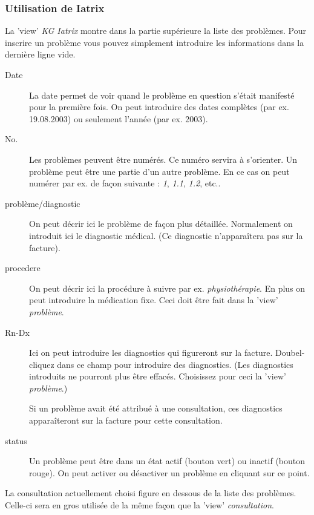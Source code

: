 \subsubsection{Utilisation de Iatrix}

La 'view' \textit{KG Iatrix} montre dans la partie supérieure la liste des problèmes.
Pour inscrire un problème vous pouvez simplement introduire les informations dans la dernière ligne vide.

\begin{description}

\item[Date]
La date permet de voir quand le problème en question s'était manifesté pour la première fois. On peut introduire des dates complètes (par ex. 19.08.2003) ou seulement l'année (par ex. 2003).

\item[No.]
Les problèmes peuvent être numérés. Ce numéro servira à s'orienter. Un problème peut être une partie d'un autre problème. En ce cas on peut numérer par ex. de façon suivante : \textit{1}, \textit{1.1}, \textit{1.2}, etc..

\item[problème/diagnostic]
On peut décrir ici le problème de façon plus détaillée. Normalement on introduit ici le diagnostic médical. (Ce diagnostic n'apparaîtera pas sur la facture).

\item[procedere]
On peut décrir ici la procédure à suivre par ex. \textit{physiothérapie}.
En plus on peut introduire la médication fixe. Ceci doit être fait dans la 'view' \textit{problème}.

\item[Rn-Dx]
Ici on peut introduire les diagnostics qui figureront sur la facture. Doubel-cliquez dans ce champ pour introduire des diagnostics. (Les diagnostics introduits ne pourront plus être effacés. Choisissez pour ceci la 'view'  \textit{problème}.)

Si un problème avait été attribué à une consultation, ces diagnostics apparaîteront sur la facture pour cette consultation.

\item[status]
Un problème peut être dans un état actif (bouton vert) ou inactif (bouton rouge). On peut activer ou désactiver un problème en cliquant sur ce point.

\end{description}

La consultation actuellement choisi figure en dessous de la liste des problèmes. Celle-ci sera en gros utilisée de la même façon que la 'view' \textit{consultation}.

